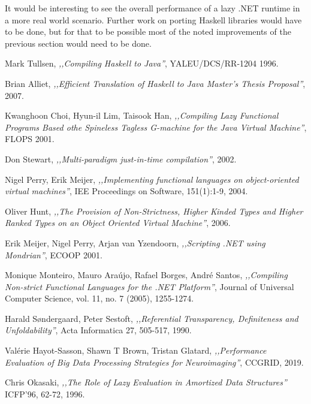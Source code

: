 \documentclass[en]{pracamgr}
\begin{document}
It would be interesting to see the overall performance of a lazy .NET runtime
in a more real world scenario. Further work on porting Haskell libraries
would have to be done, but for that to be possible most of the noted
improvements of the previous section would need to be done.

\begin{thebibliography}{99}

 Mark Tullsen, \textit{,,Compiling Haskell to Java''}, YALEU/DCS/RR-1204
1996.

 Brian Alliet, \textit{,,Efficient Translation of Haskell to Java
Master’s Thesis Proposal''}, 2007.

 Kwanghoon Choi, Hyun-il Lim, Taisook Han, \textit{,,Compiling Lazy Functional Programs Based othe Spineless Tagless G-machine for the Java Virtual Machine''}, FLOPS 2001.

 Don Stewart, \textit{,,Multi-paradigm just-in-time compilation''}, 2002.

 Nigel Perry, Erik Meijer, \textit{,,Implementing functional languages on object-oriented virtual machines''}, IEE Proceedings on Software, 151(1):1-9, 2004.

 Oliver Hunt, \textit{,,The Provision of Non-Strictness, Higher Kinded Types
and Higher Ranked Types on an Object Oriented Virtual Machine''}, 2006.

 Erik Meijer, Nigel Perry, Arjan van Yzendoorn, \textit{,,Scripting .NET using Mondrian''}, ECOOP 2001.

 Monique Monteiro, Mauro Ara\'ujo, Rafael Borges, Andr\'e Santos,  \textit{,,Compiling Non-strict Functional Languages for the .NET Platform''}, Journal of Universal Computer Science, vol. 11, no. 7 (2005), 1255-1274.

 Harald Søndergaard, Peter Sestoft, \textit{,,Referential Transparency, Definiteness and Unfoldability''}, Acta Informatica 27, 505-517, 1990.

 Val\'erie Hayot-Sasson, Shawn T Brown, Tristan Glatard, \textit{,,Performance Evaluation of Big Data Processing Strategies for Neuroimaging''}, CCGRID, 2019.

 Chris Okasaki, \textit{,,The Role of Lazy Evaluation in Amortized Data Structures''} ICFP'96, 62-72, 1996.


\end{thebibliography}
\end{document}
